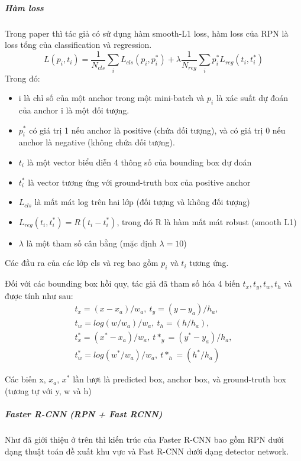 \subparagraph{Hàm loss\\}
Trong paper thì tác giả có sử dụng hàm smooth-L1 loss, hàm loss của RPN là loss tổng của classification và regression.
\begin{equation*}
    L({p_i}, {t_i}) = \frac{1}{N_{cls}}\sum_i L_{cls}(p_i, p^*_i) + \lambda \frac{1}{N_{reg}}\sum_i p^*_i L_{reg}(t_i, t^*_i)
\end{equation*}
Trong đó:
\begin{itemize}[noitemsep, topsep=0pt, leftmargin=1.25em, label={$-$}]
    \item i là chỉ số của một anchor trong một mini-batch và \(p_i\) là xác suất dự đoán của anchor i là một đối tượng.
    \item \(p^*_i\) có giá trị 1 nếu anchor là positive (chứa đối tượng), và có giá trị 0 nếu anchor là negative (không chứa đối tượng).
    \item \(t_i\) là một vector biểu diễn 4 thông số của bounding box dự đoán
    \item \(t^*_i\) là vector tương ứng với ground-truth box của positive anchor
    \item \(L_{cls}\) là mất mát log trên hai lớp (đối tượng và không đối tượng)
    \item \(L_{reg}(t_i, t^*_i) = R(t_i - t^*_i)\), trong đó R là hàm mất mát robust (smooth L1)
    \item \(\lambda\) là một tham số cân bằng (mặc định $\lambda = 10$)
\end{itemize}
Các đầu ra của các lớp cls và reg bao gồm $p_i$ và $t_i$ tương ứng.

Đối với các bounding box hồi quy, tác giả đã tham số hóa 4 biến $t_x, t_y, t_w, t_h$ và được tính như sau:
\begin{gather*}
    t_x = (x - x_a)/w_a,\ t_y = (y - y_a)/h_a,\\
    t_w = log(w/w_a)/w_a,\ t_h = (h/h_a),\\
    t^*_x = (x^* - x_a)/w_a,\ t*_y = (y^* - y_a)/h_a,\\
    t^*_w = log(w^*/w_a)/w_a,\ t*_h = (h^*/h_a)
\end{gather*}

Các biến x, $x_a$, $x^*$ lần lượt là predicted box, anchor box, và ground-truth box (tương tự với y, w và h)

\subparagraph{Faster R-CNN (RPN + Fast RCNN)\\}
Như đã giới thiệu ở trên thì kiến trúc của Faster R-CNN bao gồm RPN dưới dạng thuật toán đề xuất khu vực và Fast R-CNN dưới dạng detector network.

